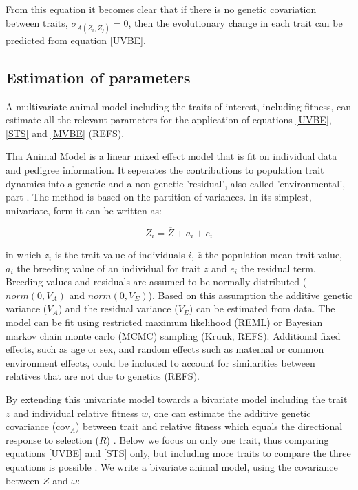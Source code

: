 From this equation it becomes clear that if there is no genetic covariation between traits, $\sigma_{A(Z_i,Z_j)}=0$, then the evolutionary change in each trait can be predicted from equation \ref{UVBE}.

\subsection{Estimation of parameters}

A multivariate animal model including the traits of interest, including fitness, can estimate all the relevant parameters for the application of equations \ref{UVBE}, \ref{STS} and \ref{MVBE} (REFS).

Tha Animal Model is a linear mixed effect model that is fit on individual data and pedigree information. It seperates the contributions to population trait dynamics into a genetic and a non-genetic 'residual', also called 'environmental', part  \citep{Lynch1998}. The method is based on the partition of variances. In its simplest, univariate, form it can be written as:

\begin{equation}
	Z_i = \overline{Z} + a_i + e_i
\end{equation}

in which $z_i$ is the trait value of individuals $i$, $\overline{z}$ the population mean trait value, $a_i$ the breeding value of an individual for trait $z$ and $e_i$ the residual term. Breeding values and residuals are assumed to be normally distributed ($norm(0,V_A)$ and $norm(0,V_E)$). Based on this assumption the additive genetic variance ($V_A$) and the residual variance ($V_E$) can be estimated from data. The model can be fit using restricted maximum likelihood (REML) or Bayesian markov chain monte carlo (MCMC) sampling (Kruuk, REFS). Additional fixed effects, such as age or sex, and random effects such as maternal or common environment effects, could be included to account for similarities between relatives that are not due to genetics (REFS).

By extending this univariate model towards a bivariate model including the trait $z$ and individual relative fitness $w$, one can estimate the additive genetic covariance ($\mathrm{cov}_A$) between trait and relative fitness which equals the directional response to selection ($R$) \citep{Morrissey2010}. Below we focus on only one trait, thus comparing equations \ref{UVBE} and \ref{STS} only, but including more traits to compare the three equations is possible \citep{Stinchcombe2014}. We write a bivariate animal model, using the covariance between $Z$ and $\omega$:

